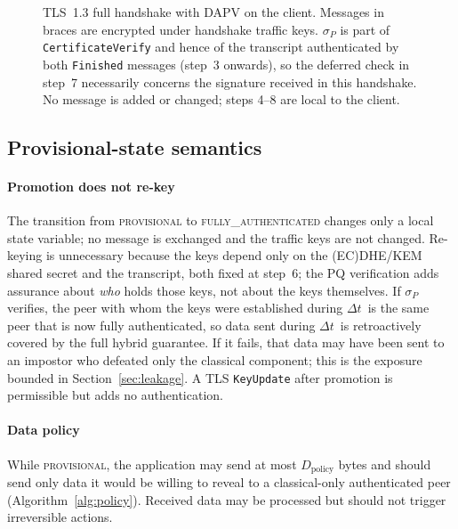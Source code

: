 \documentclass[preprint,10pt,3p]{elsarticle}
\newcommand{\Dt}{\ensuremath{\Delta t}}
\newcommand{\state}[1]{\textsc{#1}}
\begin{document}
\begin{figure}[t]
\caption{TLS~1.3 full handshake with DAPV on the client.  Messages in braces
  are encrypted under handshake traffic keys.  $\sigma_P$ is part of
  \texttt{CertificateVerify} and hence of the transcript authenticated by
  both \texttt{Finished} messages (step~3 onwards), so the deferred check in
  step~7 necessarily concerns the signature received in this handshake.
  No message is added or changed; steps 4--8 are local to the client.}
\label{fig:sequence}
\end{figure}

\subsection{Provisional-state semantics}
\label{sec:state_semantics}

\paragraph{Promotion does not re-key}  The transition from
\state{provisional} to \state{fully\_authenticated} changes only a local
state variable; no message is exchanged and the traffic keys are not
changed.  Re-keying is unnecessary because the keys depend only on the
(EC)DHE/KEM shared secret and the transcript, both fixed at step~6; the
PQ verification adds assurance about \emph{who} holds those keys, not about
the keys themselves.  If $\sigma_P$ verifies, the peer with whom the keys
were established during \Dt\ is the same peer that is now fully
authenticated, so data sent during \Dt\ is retroactively covered by the
full hybrid guarantee.  If it fails, that data may have been sent to an
impostor who defeated only the classical component; this is the exposure
bounded in Section~\ref{sec:leakage}.  A TLS \texttt{KeyUpdate} after
promotion is permissible but adds no authentication.

\paragraph{Data policy}  While \state{provisional}, the application may
send at most $D_\text{policy}$ bytes and should send only data it would be
willing to reveal to a classical-only authenticated peer
(Algorithm~\ref{alg:policy}).  Received data may be processed but should
not trigger irreversible actions.
\end{document}
